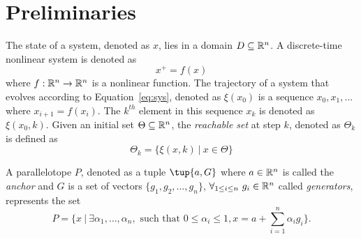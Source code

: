 
\section{Preliminaries}
\label{sec:prelims}

The state of a system, denoted as $x$, lies in a domain $D \subseteq \reals^n$.
%
A discrete-time nonlinear system is denoted as
\begin{equation}
  x^{+} = f(x)
\label{eq:sys}
\end{equation}
%
where $f: \reals^{n} \rightarrow \reals^{n}$ is a nonlinear function.
%
The trajectory of a system that evolves according to Equation~\ref{eq:sys}, denoted as $\xi(x_0)$ is a sequence $x_0, x_1, \ldots $ where $x_{i+1} = f(x_i)$.
%
The $k^{th}$ element in this sequence $x_k$ is denoted as $\xi(x_0,k)$.
%
Given an initial set $\Theta \subseteq \reals^n$, the \emph{reachable set} at step $k$, denoted as $\Theta_k$ is defined as
\begin{equation}
  \Theta_k = \{ \xi(x,k)\: | \: x \in \Theta\}
\label{eq:reachset}
\end{equation}


A parallelotope $P$, denoted as a tuple $\tup{a, G}$ where $a \in \reals^n$ is called the \emph{anchor} and $G$ is a set of vectors $\{g_1, g_2, \ldots, g_n\}$, $\forall_{1 \leq i \leq n} ~ g_i \in \reals^n$ called \emph{generators}, represents the set
\begin{equation}
P = \{ x\:|\: \exists \alpha_1, \ldots, \alpha_n, \mbox{ such that }  0 \leq \alpha_i \leq 1, x = a + \sum_{i=1}^n \alpha_i g_i \}.
\label{eq:ptope}
\end{equation}

